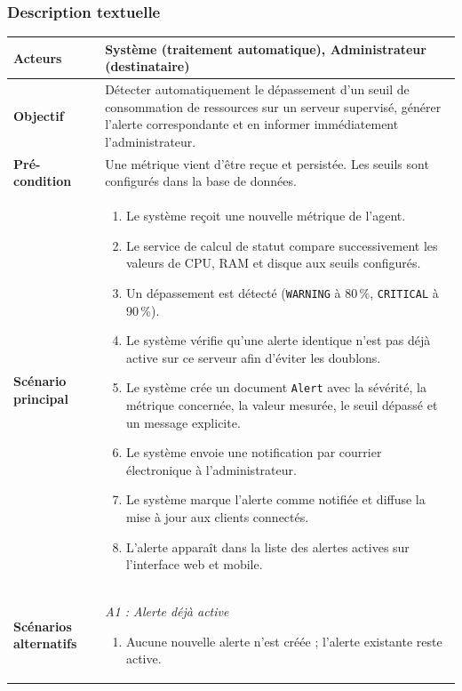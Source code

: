 \subsubsection*{Description textuelle}

\renewcommand{\arraystretch}{1.4}
\begin{longtable}{|p{3.0cm}|>{\raggedright\arraybackslash}p{11.4cm}|}
\hline
\textbf{Acteurs} & Système (traitement automatique), Administrateur (destinataire) \\
\hline
\textbf{Objectif} & Détecter automatiquement le dépassement d'un seuil de consommation
de ressources sur un serveur supervisé, générer l'alerte correspondante et en informer
immédiatement l'administrateur. \\
\hline
\textbf{Pré-condition} & Une métrique vient d'être reçue et persistée. Les seuils sont
configurés dans la base de données. \\
\hline
\textbf{Scénario principal} &
\begin{enumerate}[leftmargin=*, nosep]
  \item Le système reçoit une nouvelle métrique de l'agent.
  \item Le service de calcul de statut compare successivement les valeurs de CPU, RAM et
        disque aux seuils configurés.
  \item Un dépassement est détecté (\texttt{WARNING} à 80\,\%, \texttt{CRITICAL} à
        90\,\%).
  \item Le système vérifie qu'une alerte identique n'est pas déjà active sur ce serveur
        afin d'éviter les doublons.
  \item Le système crée un document \texttt{Alert} avec la sévérité, la métrique
        concernée, la valeur mesurée, le seuil dépassé et un message explicite.
  \item Le système envoie une notification par courrier électronique à l'administrateur.
  \item Le système marque l'alerte comme notifiée et diffuse la mise à jour aux clients
        connectés.
  \item L'alerte apparaît dans la liste des alertes actives sur l'interface web et
        mobile.
\end{enumerate} \\
\hline
\textbf{Scénarios alternatifs} &
\textit{A1 : Alerte déjà active}
\begin{enumerate}[leftmargin=*, nosep]
  \item Aucune nouvelle alerte n'est créée ; l'alerte existante reste active.

\end{enumerate}
\end{longtable}
